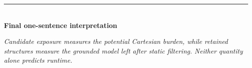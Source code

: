 \documentclass[11pt,a4paper]{article}
\begin{document}
\vfill
\begin{center}
\color{RoutlyNavy}
\rule{0.32\textwidth}{0.6pt}\\[2mm]
\textbf{Final one-sentence interpretation}\\[1mm]
\begin{minipage}{0.88\textwidth}
\centering\itshape
Candidate exposure measures the potential Cartesian burden, while retained
structures measure the grounded model left after static filtering. Neither
quantity alone predicts runtime.
\end{minipage}
\end{center}
\end{document}
